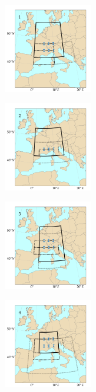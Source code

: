 \documentclass{ametsoc}
\begin{document}
\begin{figure}[htb]
	\centering
	\begin{subfigure}{.5\columnwidth}
		\centering
		\includegraphics[width=3.9cm]{figures/spatial_win_z4-hi2/Spatial_windows_1.png}
	\end{subfigure}%
	\begin{subfigure}{.5\columnwidth}
		\centering
		\includegraphics[width=3.9cm]{figures/spatial_win_z4-hi2/Spatial_windows_2.png}
	\end{subfigure}
	\begin{subfigure}{.5\columnwidth}
		\centering
		\includegraphics[width=3.9cm]{figures/spatial_win_z4-hi2/Spatial_windows_3.png}
	\end{subfigure}%
	\begin{subfigure}{.5\columnwidth}
		\centering
		\includegraphics[width=3.9cm]{figures/spatial_win_z4-hi2/Spatial_windows_4.png}
	\end{subfigure}

\end{figure}
\end{document}
